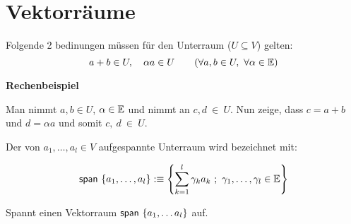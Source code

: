 \section{Vektorräume}

	
	\begin{fdef}
		Folgende 2 bedinungen müssen für den Unterraum ($U \subseteq V$) gelten:
		\[
			a + b \in U, \quad \alpha a \in U \qquad 
			(\forall a,b \in U, \ \forall \alpha \in \mathbb{E})
		\]
	\end{fdef}

	\textbf{Rechenbeispiel}
	
	Man nimmt $a, b \in U$, $\alpha \in \mathbb{E}$ und nimmt an $c,d~\in~U$. Nun zeige, 
	dass $c = a + b$ und $d = \alpha a$ und somit $c,~d~\in~U$.
	
	\begin{fdef}
		Der von $a_1, \dots ,a_l \in V$ aufgespannte
		Unterraum wird bezeichnet mit:
		
		\[
			\mathsf{span} \ \{a_1,\dots,a_l\} :\equiv
			\left\{
				\sum_{k=1}^{l} \gamma_k a_k \ ; \ \gamma_1, \dots ,\gamma_l \in \mathbb{E}
			\right\}
		\]
	\end{fdef}

	
	\begin{fdef}[Erzeugendensystem]
		Spannt einen Vektorraum $\mathsf{span} \ \{a_1, \dots a_l\}$ auf.
	\end{fdef}
	
	
